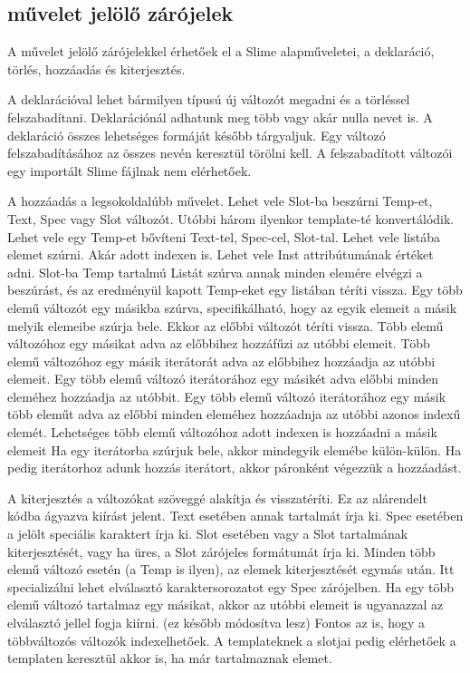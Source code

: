 \subsection{művelet jelölő zárójelek}
A művelet jelölő zárójelekkel érhetőek el a Slime alapműveletei, a deklaráció, törlés, hozzáadás és kiterjesztés. 

A deklarációval lehet bármilyen típusú új változót megadni és a törléssel felszabadítani.
Deklarációnál adhatunk meg több vagy akár nulla nevet is.
A deklaráció összes lehetséges formáját később tárgyaljuk.
Egy változó felszabadításához az összes nevén keresztül törölni kell.
A felszabadított változói egy importált Slime fájlnak nem elérhetőek.

A hozzáadás a legsokoldalúbb művelet. 
Lehet vele Slot-ba beszúrni Temp-et, Text, Spec vagy Slot változót. 
Utóbbi három ilyenkor template-té konvertálódik. 
Lehet vele egy Temp-et bővíteni Text-tel, Spec-cel, Slot-tal. 
Lehet vele listába elemet szúrni. Akár adott indexen is.
Lehet vele Inst attribútumának értéket adni. 
Slot-ba Temp tartalmú Listát szúrva annak minden elemére elvégzi a beszúrást, és az eredményül kapott Temp-eket egy listában téríti vissza. 
Egy több elemű változót egy másikba szúrva, specifikálható, hogy az egyik elemeit a másik melyik elemeibe szúrja bele. 
Ekkor az előbbi változót téríti vissza. 
Több elemű változóhoz egy másikat adva az előbbihez hozzáfűzi az utóbbi elemeit.
Több elemű változóhoz egy másik iterátorát adva az előbbihez hozzáadja az utóbbi elemeit.
Egy több elemű változó iterátorához egy másikét adva előbbi minden eleméhez hozzáadja az utóbbit.
Egy több elemű változó iterátorához egy másik több eleműt adva az előbbi minden eleméhez hozzáadnja az utóbbi azonos indexű elemét.
Lehetséges több elemű változóhoz adott indexen is hozzáadni a másik elemeit
Ha egy iterátorba szúrjuk bele, akkor mindegyik elemébe külön-külön. Ha pedig iterátorhoz adunk hozzás iterátort, akkor páronként végezzük a hozzáadást.

A kiterjesztés a változókat szöveggé alakítja és visszatéríti.
Ez az alárendelt kódba ágyazva kiírást jelent. 
Text esetében annak tartalmát írja ki.
Spec esetében a jelölt speciális karaktert írja ki.
Slot esetében vagy a Slot tartalmának kiterjesztését, vagy ha üres, a Slot zárójeles formátumát írja ki. 
Minden több elemű változó esetén (a Temp is ilyen), az elemek kiterjesztését egymás után. 
Itt specializálni lehet elválasztó karaktersorozatot egy Spec zárójelben. 
Ha egy több elemű változó tartalmaz egy másikat, akkor az utóbbi elemeit is ugyanazzal az elválasztó jellel fogja kiírni. 
(ez később módosítva lesz)
Fontos az is, hogy a többváltozós változók indexelhetőek. 
A templateknek a slotjai pedig elérhetőek a templaten keresztül akkor is, ha már tartalmaznak elemet.


